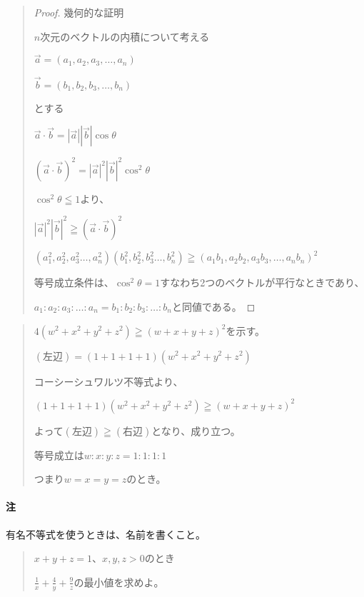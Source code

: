 \documentclass[uplatex,fleqn]{jsbook}
\begin{document}
\begin{quote}
    \begin{proof}
        幾何的な証明

        $n$次元のベクトルの内積について考える

        $\vec{a}=\left(a_1,a_2,a_3,\dots,a_n\right)$

        $\vec{b}=\left(b_1,b_2,b_3,\dots,b_n\right)$

        とする

        $\vec{a}\cdot\vec{b}=|\vec{a}||\vec{b}|\cos\theta$

        $\left(\vec{a}\cdot\vec{b}\right)^2=|\vec{a}|^2|\vec{b}|^2\cos^2\theta$

        $\cos^2\theta\leqq1$より、

        $|\vec{a}|^2|\vec{b}|^2\geqq\left(\vec{a}\cdot\vec{b}\right)^2$

        $\left(a^2_1,a^2_2,a^2_3\dots,a^2_n\right)\left(b^2_1,b^2_2,b^2_3\dots,b^2_n\right)\geqq\left(a_1b_1,a_2b_2,a_3b_3,\dots,a_nb_n\right)^2$

        等号成立条件は、$\cos^2\theta=1$すなわち2つのベクトルが平行なときであり、

        $a_1:a_2:a_3:\dots:a_n=b_1:b_2:b_3:\dots:b_n$と同値である。
    \end{proof}
\end{quote}

\begin{quote}
    $4\left(w^2+x^2+y^2+z^2\right)\geqq \left(w+x+y+z\right)^2$を示す。

    $\left(\text{左辺}\right)=\left(1+1+1+1\right)\left(w^2+x^2+y^2+z^2\right)$

    コーシーシュワルツ不等式より、

    $\left(1+1+1+1\right)\left(w^2+x^2+y^2+z^2\right)\geqq \left(w+x+y+z\right)^2$

    よって$\left(\text{左辺}\right)\geqq \left(右辺\right)$となり、成り立つ。

    等号成立は$w:x:y:z=1:1:1:1$

    つまり$w=x=y=z$のとき。
\end{quote}

\paragraph{注}有名不等式を使うときは、名前を書くこと。

\begin{quote}
    $x+y+z=1$、$x,y,z>0$のとき

    $\displaystyle \frac{1}{x}+\frac{4}{y}+\frac{9}{z}$の最小値を求めよ。
\end{quote}
\end{document}
